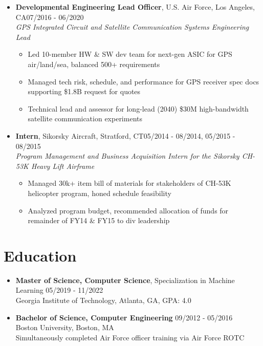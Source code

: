 \documentclass{article}
\begin{document}
\begin{itemize}
    \item \textbf{Developmental Engineering Lead Officer}, U.S. Air Force, Los Angeles, CA\hfill 07/2016 - 06/2020 \\ \emph{GPS Integrated Circuit and Satellite Communication Systems Engineering Lead}
    \vspace{-\topsep} \vspace{0.2em}
    \begin{itemize}
        \itemsep0em
        \item Led 10-member HW \& SW dev team for next-gen ASIC for GPS air/land/sea, balanced 500+ requirements
        \item Managed tech risk, schedule, and performance for GPS receiver spec docs supporting \$1.8B request for quotes
        \item Technical lead and assessor for long-lead (2040) \$30M high-bandwidth satellite communication experiments
    \end{itemize}
    
    \item \textbf{Intern}, Sikorsky Aircraft, Stratford, CT\hfill 05/2014 - 08/2014, 05/2015 - 08/2015 \\ \emph{Program Management and Business Acquisition Intern for the Sikorsky CH-53K Heavy Lift Airframe}
    \vspace{-\topsep} \vspace{0.2em}
    \begin{itemize}
        \itemsep0em
        \item Managed 30k+ item bill of materials for stakeholders of CH-53K helicopter program, honed schedule feasibility
        \item Analyzed program budget, recommended allocation of funds for remainder of FY14 \& FY15 to div leadership
    \end{itemize} \end{itemize} 


\section{Education} \begin{itemize}
    \itemsep0.2em
    \item \textbf{Master of Science, Computer Science}, Specialization in Machine Learning \hfill 05/2019 - 11/2022\\Georgia Institute of Technology, Atlanta, GA, GPA: 4.0
    \item \textbf{Bachelor of Science, Computer Engineering} \hfill 09/2012 - 05/2016\\Boston University, Boston, MA\\Simultaneously completed Air Force officer training via Air Force ROTC  \end{itemize} 
\end{document}
